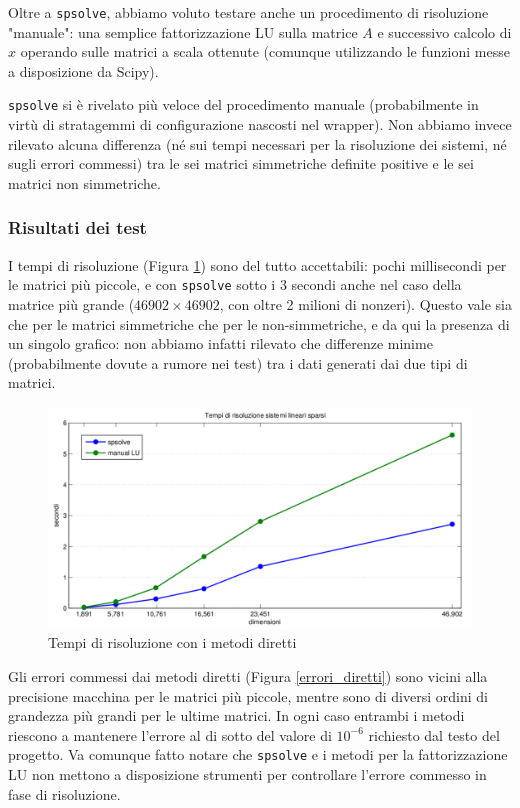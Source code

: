 \documentclass[11pt,a4paper]{scrartcl}
\begin{document}
Oltre a \texttt{spsolve}, abbiamo voluto testare anche un procedimento di risoluzione "manuale": una semplice fattorizzazione LU sulla matrice $A$ e successivo calcolo di $x$ operando sulle matrici a scala ottenute (comunque utilizzando le funzioni messe a disposizione da Scipy).

\texttt{spsolve} si è rivelato più veloce del procedimento manuale (probabilmente in virtù di stratagemmi di configurazione nascosti nel wrapper). Non abbiamo invece rilevato alcuna differenza (né sui tempi necessari per la risoluzione dei sistemi, né sugli errori commessi) tra le sei matrici simmetriche definite positive e le sei matrici non simmetriche. 

\subsubsection*{Risultati dei test}

I tempi di risoluzione (Figura \ref{tempi_diretti}) sono del tutto accettabili: pochi millisecondi per le matrici più piccole, e con \texttt{spsolve} sotto i 3 secondi anche nel caso della matrice più grande ($46902 \times 46902$, con oltre 2 milioni di nonzeri). Questo vale sia che per le matrici simmetriche che per le non-simmetriche, e da qui la presenza di un singolo grafico: non abbiamo infatti rilevato che differenze minime (probabilmente dovute a rumore nei test) tra i dati generati dai due tipi di matrici.

\begin{figure}[!ht]
\centering
\includegraphics[scale=0.50]{images/tempi_diretti} 
\caption{Tempi di risoluzione con i metodi diretti}
\label{tempi_diretti}
\end{figure}

Gli errori commessi dai metodi diretti (Figura \ref{errori_diretti}) sono vicini alla precisione macchina per le matrici più piccole, mentre sono di diversi ordini di grandezza più grandi per le ultime matrici. In ogni caso entrambi i metodi riescono a mantenere l'errore al di sotto del valore di $10^{-6}$ richiesto dal testo del progetto. Va comunque fatto notare che \texttt{spsolve} e i metodi per la fattorizzazione LU non mettono a disposizione strumenti per controllare l'errore commesso in fase di risoluzione.
\end{document}
